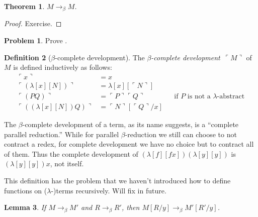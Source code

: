 \documentclass[10pt,a4paper]{article}
\makeatletter
\theoremstyle{plain}
\newtheorem{thm}{Theorem}[section]
\newtheorem{lem}[thm]{Lemma}
\theoremstyle{definition}
\newtheorem{defn}[thm]{Definition}
\newtheorem{prob}{Problem}[section]
\theoremstyle{remark}
\newenvironment{editorial}{}{}
\newcommand*{\ollabel}[1]{\label{#1}}
\newcommand{\olref}{\@ifnextchar[{\olref@i}{\olref@final}}
\def\olref@i[#1]{\@ifnextchar[{\olref@ii}{\olref@final}}
\def\olref@ii[#1]{\@ifnextchar[{\olref@iii}{\olref@final}}
\def\olref@iii[#1]{\olref@final}
\def\olref@final#1{\ref{#1}}
\providecommand{\Subst}[3]{#1[#2/#3]}
\providecommand{\lambd}{\ensuremath{\lambda}}
\providecommand{\bredpar}{\mathrel{\rightarrow_\beta}}
\providecommand{\bcd}[1]{\ensuremath{\ulcorner #1 \urcorner}}
\makeatother
\begin{document}
\begin{thm}\ollabel{thm:refl}
  $M \bredpar M$.
\end{thm}

\begin{proof}
  Exercise.
\end{proof}

\begin{prob}
  Prove \olref[lam][cr][pb]{thm:refl}.
\end{prob}

\begin{defn}[$\beta$-complete development]\ollabel{defn:bcd}
  The \emph{$\beta$-complete development}~$\bcd{M}$ of $M$ is defined
  inductively as follows:
  \begin{align}
    \bcd{x} &= x \ollabel{defn:bcd1} \\
    \bcd{(\lambd[x][N])} &= \lambd[x][\bcd{N}] \ollabel{defn:bcd2}\\
    \bcd{(PQ)} &= \bcd{P}\bcd{Q} && \text{if $P$ is not a $\lambd$-abstract} 
    \ollabel{defn:bcd3} \\
    \bcd{((\lambd[x][N])Q)} &= \Subst{\bcd{N}}{\bcd{Q}}{x} \ollabel{defn:bcd4}
  \end{align}
\end{defn}

The $\beta$-complete development of a term, as its name suggests, is a
``complete parallel reduction.'' While for parallel $\beta$-reduction we still
can choose to not contract a redex, for complete development we have
no choice but to contract all of them. Thus the complete development
of $(\lambd[f][fx])(\lambd[y][y])$ is $(\lambd[y][y])x$, not itself.

\begin{editorial}
  This definition has the problem that we haven't introduced how to
  define functions on ($\lambd$-)terms recursively. Will fix in future.
\end{editorial}

\begin{lem}\ollabel{lem:comp}
  If $M \bredpar M'$ and $R \bredpar R'$, then $\Subst{M}{R}{y}
  \bredpar \Subst{M'}{R'}{y}$.
\end{lem}
\end{document}
